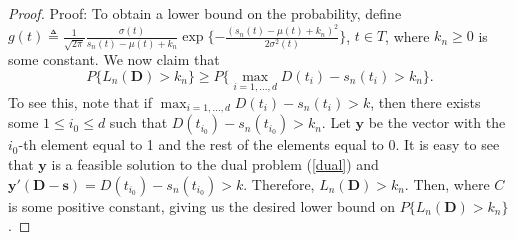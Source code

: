 \documentclass[final,11pt,3p]{article}\usepackage{setspace}
\begin{document}
\begin{proof}{Proof:}
	To obtain a lower bound on the probability, define 	$g(t) \triangleq \frac{1}{\sqrt{2 \pi}} \frac{\sigma(t)}{s_n(t)-{\mu}(t)+k_n}\exp\{-\frac{(s_n(t)-{\mu}(t)+k_n)^2}{2\sigma^2(t)}\}$,	$t \in T$, 
	where $k_n \ge 0$ is some constant. We now claim that
	\begin{equation*}
		P\{L_n(\boldsymbol{D}) > k_n\}  \ge P\{\max_{i=1,\dots,d} D(t_i)-s_n(t_i) > k_n\}.
	\end{equation*}
	To see this, note that if $\max_{i=1,\dots,d} D(t_i)-s_n(t_i) > k$, then there exists some $1 \le i_0 \le d$ such that ${D}(t_{i_0})-s_n(t_{i_0}) > k_n$. Let $\boldsymbol{y}$ be the vector with the $i_0$-th element equal to 1 and the rest of the elements equal to 0. It is easy to see that $\boldsymbol{y}$ is a feasible solution to the dual problem (\ref{dual}) and $\boldsymbol{y}'(\boldsymbol{D}-\boldsymbol{s}) = D(t_{i_0})-s_n(t_{i_0}) > k$. Therefore, $L_n(\boldsymbol{D}) > k_n$. Then,
{{}}
	where $C$ is some positive constant, {{}}
	giving us the desired lower bound on $P\{L_n(\boldsymbol{D}) > k_n\}$.
	

\end{proof}
\end{document}
